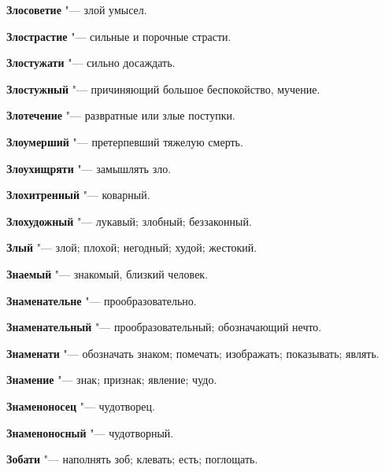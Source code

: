 \begin{mymulticols}{2}
\noindent\textbf{Злосоветие} "--- злой умысел. 




\noindent\textbf{Злострастие} "--- сильные и порочные страсти. 




\noindent\textbf{Злостужати} "--- сильно досаждать. 




\noindent\textbf{Злостужный} "--- причиняющий большое беспокойство, мучение. 




\noindent\textbf{Злотечение} "--- развратные или злые поступки. 




\noindent\textbf{Злоумерший} "--- претерпевший тяжелую смерть. 




\noindent\textbf{Злоухищряти} "--- замышлять зло. 




\noindent\textbf{Злохитренный} "--- коварный. 




\noindent\textbf{Злохудожный} "--- лукавый; злобный; беззаконный. 




\noindent\textbf{Злый} "--- злой; плохой; негодный; худой; жестокий. 




\noindent\textbf{Знаемый} "--- знакомый, близкий человек. 




\noindent\textbf{Знаменательне} "--- прообразовательно. 




\noindent\textbf{Знаменательный} "--- прообразовательный; обозначающий нечто. 




\noindent\textbf{Знаменати} "--- обозначать знаком; помечать; изображать; показывать; являть. 




\noindent\textbf{Знамение} "--- знак; признак; явление; чудо. 




\noindent\textbf{Знаменоносец} "--- чудотворец. 




\noindent\textbf{Знаменоносный} "--- чудотворный. 




\noindent\textbf{Зобати} "--- наполнять зоб; клевать; есть; поглощать. 





\end{mymulticols}
